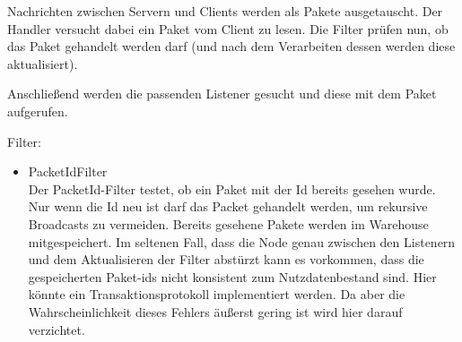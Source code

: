 Nachrichten zwischen Servern und Clients werden als Pakete ausgetauscht. Der Handler versucht dabei ein Paket vom Client zu lesen. Die Filter prüfen nun, ob das Paket gehandelt werden darf (und nach dem Verarbeiten dessen werden diese aktualisiert).

Anschließend werden die passenden Listener gesucht und diese mit dem Paket aufgerufen.




Filter:
\begin{itemize}
    \item PacketIdFilter\\
        Der PacketId-Filter testet, ob ein Paket mit der Id bereits gesehen wurde. Nur wenn die Id neu ist darf das Packet gehandelt werden, um rekursive Broadcasts zu vermeiden. Bereits gesehene Pakete werden im Warehouse mitgespeichert. Im seltenen Fall, dass die Node genau zwischen den Listenern und dem Aktualisieren der Filter abstürzt kann es vorkommen, dass die gespeicherten Paket-ids nicht konsistent zum Nutzdatenbestand sind. Hier könnte ein Transaktionsprotokoll implementiert werden. Da aber die Wahrscheinlichkeit dieses Fehlers äußerst gering ist wird hier darauf verzichtet.
        
\end{itemize}



